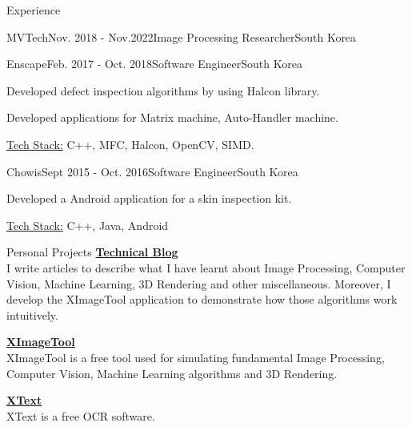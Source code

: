 \documentclass{resume}
\begin{document}
\begin{rSection}{Experience}
\begin{rSubsection}{MVTech}{Nov. 2018 - Nov.2022}{Image Processing Researcher}{South Korea}
		\end{rSubsection}

		\begin{rSubsection}{Enscape}{Feb. 2017 - Oct. 2018}{Software Engineer}{South Korea}
			\item Developed defect inspection algorithms by using Halcon library.
			\item Developed applications for Matrix machine, Auto-Handler machine.
			\item \underline{Tech Stack:} C++, MFC, Halcon, OpenCV,  SIMD.

		\end{rSubsection}

		\begin{rSubsection}{Chowis}{Sept 2015 - Oct. 2016}{Software Engineer}{South Korea}
			\item Developed a Android application for a skin inspection kit.
			\item \underline{Tech Stack:} C++, Java, Android

		\end{rSubsection}
	\end{rSection}

	\begin{rSection}{Personal Projects}
		{\bf \href{https://noidh.github.io/blog.html}{Technical Blog}}
		\\ I write articles to describe what I have learnt about Image Processing, Computer Vision, Machine Learning, 3D Rendering and other miscellaneous.  Moreover,  I develop the XImageTool application to demonstrate how those algorithms work intuitively.

		{\bf  \href{https://noidh.github.io/pages/sw/ximagetool/ximagetool.html}{XImageTool}}
		\\ XImageTool is a free tool used for simulating fundamental Image Processing, Computer Vision, Machine Learning algorithms and 3D Rendering.

		{\bf \href{https://noidh.github.io/pages/sw/ximage2text/ximagetotext.html}{XText}}
		\\ XText is a free OCR software.
	\end{rSection}
\end{document}
